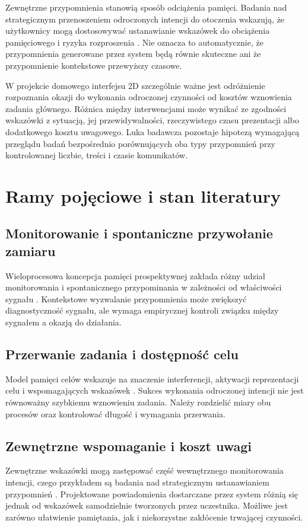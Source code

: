 \documentclass[11pt,a4paper]{article}
\begin{document}
Zewnętrzne przypomnienia stanowią sposób odciążenia pamięci. Badania nad strategicznym przenoszeniem odroczonych intencji do otoczenia wskazują, że użytkownicy mogą dostosowywać ustanawianie wskazówek do obciążenia pamięciowego i ryzyka rozproszenia \cite{Gilbert2015}. Nie oznacza to automatycznie, że przypomnienia generowane przez system będą równie skuteczne ani że przypomnienie kontekstowe przewyższy czasowe.

W projekcie domowego interfejsu 2D szczególnie ważne jest odróżnienie rozpoznania okazji do wykonania odroczonej czynności od kosztów wznowienia zadania głównego. Różnica między interwencjami może wynikać ze zgodności wskazówki z sytuacją, jej przewidywalności, rzeczywistego czasu prezentacji albo dodatkowego kosztu uwagowego. Luka badawcza pozostaje hipotezą wymagającą przeglądu badań bezpośrednio porównujących oba typy przypomnień przy kontrolowanej liczbie, treści i czasie komunikatów.

\section{Ramy pojęciowe i stan literatury}
\subsection{Monitorowanie i spontaniczne przywołanie zamiaru}
Wieloprocesowa koncepcja pamięci prospektywnej zakłada różny udział monitorowania i spontanicznego przypominania w zależności od właściwości sygnału \cite{McDanielEinstein2000}. Kontekstowe wyzwalanie przypomnienia może zwiększyć diagnostyczność sygnału, ale wymaga empirycznej kontroli związku między sygnałem a okazją do działania.

\subsection{Przerwanie zadania i dostępność celu}
Model pamięci celów wskazuje na znaczenie interferencji, aktywacji reprezentacji celu i wspomagających wskazówek \cite{AltmannTrafton2002}. Sukces wykonania odroczonej intencji nie jest równoważny szybkiemu wznowieniu zadania. Należy rozdzielić miary obu procesów oraz kontrolować długość i wymagania przerwania.

\subsection{Zewnętrzne wspomaganie i koszt uwagi}
Zewnętrzne wskazówki mogą zastępować część wewnętrznego monitorowania intencji, czego przykładem są badania nad strategicznym ustanawianiem przypomnień \cite{Gilbert2015}. Projektowane powiadomienia dostarczane przez system różnią się jednak od wskazówek samodzielnie tworzonych przez uczestnika. Możliwe jest zarówno ułatwienie pamiętania, jak i niekorzystne zakłócenie trwającej czynności.
\end{document}
